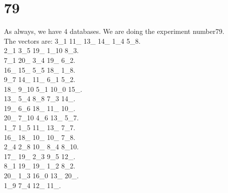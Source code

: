 \chapter{79}
\indent As always, we have 4 databases. We are doing the experiment number79.\\
The vectors are:
3\_1 11\_ 13\_ 14\_ 1\_4 5\_8.\\2\_1 3\_5 19\_ 1\_10 8\_3.\\7\_1 20\_ 3\_4 19\_ 6\_2.\\16\_ 15\_ 5\_5 18\_ 1\_8.\\9\_7 14\_ 11\_ 6\_1 5\_2.\\18\_ 9\_10 5\_1 10\_0 15\_.\\13\_ 5\_4 8\_8 7\_3 14\_.\\19\_ 6\_6 18\_ 11\_ 10\_.\\20\_ 7\_10 4\_6 13\_ 5\_7.\\1\_7 1\_5 11\_ 13\_ 7\_7.\\16\_ 18\_ 10\_ 10\_ 7\_8.\\2\_4 2\_8 10\_ 8\_4 8\_10.\\17\_ 19\_ 2\_3 9\_5 12\_.\\8\_1 19\_ 19\_ 1\_2 8\_2.\\20\_ 1\_3 16\_0 13\_ 20\_.\\1\_9 7\_4 12\_ 11\_.\\